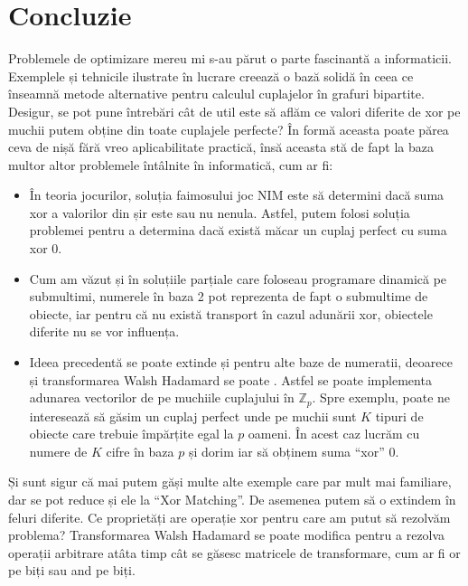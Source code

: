 \chapter{Concluzie}

Problemele de optimizare mereu mi s-au părut o parte fascinantă a informaticii.
Exemplele și tehnicile ilustrate în lucrare creează o bază solidă în ceea ce
înseamnă metode alternative pentru calculul cuplajelor în grafuri bipartite.
Desigur, se pot pune întrebări cât de util este să aflăm ce valori diferite
de xor pe muchii putem obține din toate cuplajele perfecte? În formă aceasta
poate părea ceva de nișă fără vreo aplicabilitate practică, însă aceasta stă de
fapt la baza multor altor problemele întâlnite în informatică, cum ar fi:

\begin{itemize}
  \item În teoria jocurilor, soluția faimosului joc NIM este să determini dacă
    suma xor a valorilor din șir este sau nu nenula. Astfel, putem folosi soluția
    problemei pentru a determina dacă există măcar un cuplaj perfect cu suma xor 0.

  \item Cum am văzut și în soluțiile parțiale care foloseau programare dinamică pe
    submultimi, numerele în baza 2 pot reprezenta de fapt o submultime de obiecte,
    iar pentru că nu există transport în cazul adunării xor, obiectele diferite nu
    se vor influența.

  \item Ideea precedentă se poate extinde și pentru alte baze de numeratii, deoarece
    și transformarea Walsh Hadamard se poate \cite{whtbase}. Astfel se poate implementa
    adunarea vectorilor de pe muchiile cuplajului în $\mathbb{Z}_p$. Spre exemplu,
    poate ne interesează să găsim un cuplaj perfect unde pe muchii sunt $K$ tipuri
    de obiecte care trebuie împărțite egal la $p$ oameni. În acest caz lucrăm cu
    numere de $K$ cifre în baza $p$ și dorim iar să obținem suma ``xor'' 0.
\end{itemize}

Și sunt sigur că mai putem găși multe alte exemple care par mult mai familiare,
dar se pot reduce și ele la ``Xor Matching''. De asemenea putem să o extindem în
feluri diferite. Ce proprietăți are operație xor pentru care am putut să rezolvăm
problema? Transformarea Walsh Hadamard se poate modifica pentru a rezolva operații
arbitrare atâta timp cât se găsesc matricele de transformare, cum ar fi or pe biți
sau and pe biți.


